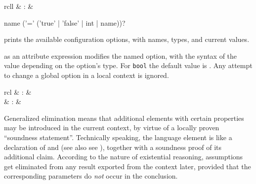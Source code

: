 \begin{isabellebody}
\begin{isamarkuptext}
  \begin{matharray}{rcll}
    \mbox{} & : &  \\
  \end{matharray}

  \begin{rail}
    name ('=' ('true' | 'false' | int | name))?
  \end{rail}

  \begin{descr}
  
  \item [\mbox{\isa{\isacommand{print{\isacharunderscore}configs}}}] prints the available
  configuration options, with names, types, and current values.
  
  \item [\isa{{\isachardoublequote}name\ {\isacharequal}\ value{\isachardoublequote}}] as an attribute expression modifies
  the named option, with the syntax of the value depending on the
  option's type.  For \verb|bool| the default value is .  Any attempt to change a global option in a local context is
  ignored.

  \end{descr}%
\end{isamarkuptext}%
\isamarkuptrue%
%
\isamarkuptrue%
%
\isamarkuptrue%
%
\begin{isamarkuptext}%
\begin{matharray}{rcl}
    \mbox{} & : &  \\
    \mbox{}\isa{{\isachardoublequote}\isactrlsup {\isacharasterisk}{\isachardoublequote}} & : &  \\
  \end{matharray}

  Generalized elimination means that additional elements with certain
  properties may be introduced in the current context, by virtue of a
  locally proven ``soundness statement''.  Technically speaking, the
  \mbox{} language element is like a declaration of
  \mbox{} and \mbox{} (see also see
  ), together with a soundness proof of its
  additional claim.  According to the nature of existential reasoning,
  assumptions get eliminated from any result exported from the context
  later, provided that the corresponding parameters do \emph{not}
  occur in the conclusion.


\end{isamarkuptext}
\end{isabellebody}
